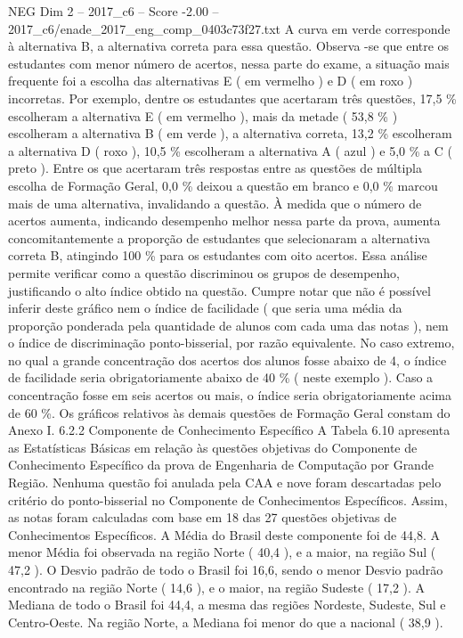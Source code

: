 \begin{textsample}{NEG Dim 2 – 2017\_c6 – Score -2.00 – 2017\_c6/enade\_2017\_eng\_comp\_0403c73f27.txt}
A curva em verde corresponde à alternativa B, a alternativa correta para essa questão.
Observa -se que entre os estudantes com menor número de acertos, nessa parte do exame, a situação mais frequente foi a escolha das alternativas E ( em vermelho ) e D ( em roxo ) incorretas.
Por exemplo, dentre os estudantes que acertaram três questões, 17,5 \% escolheram a alternativa E ( em vermelho ), mais da metade ( 53,8 \% ) escolheram a alternativa B ( em verde ), a alternativa correta, 13,2 \% escolheram a alternativa D ( roxo ), 10,5 \% escolheram a alternativa A ( azul ) e 5,0 \% a C ( preto ).
Entre os que acertaram três respostas entre as questões de múltipla escolha de Formação Geral, 0,0 \% deixou a questão em branco e 0,0 \% marcou mais de uma alternativa, invalidando a questão.
À medida que o número de acertos aumenta, indicando desempenho melhor nessa parte da prova, aumenta concomitantemente a proporção de estudantes que selecionaram a alternativa correta B, atingindo 100 \% para os estudantes com oito acertos.
Essa análise permite verificar como a questão discriminou os grupos de desempenho, justificando o alto índice obtido na questão.
Cumpre notar que não é possível inferir deste gráfico nem o índice de facilidade ( que seria uma média da proporção ponderada pela quantidade de alunos com cada uma das notas ), nem o índice de discriminação ponto-bisserial, por razão equivalente.
No caso extremo, no qual a grande concentração dos acertos dos alunos fosse abaixo de 4, o índice de facilidade seria obrigatoriamente abaixo de 40 \% ( neste exemplo ).
Caso a concentração fosse em seis acertos ou mais, o índice seria obrigatoriamente acima de 60 \%.
Os gráficos relativos às demais questões de Formação Geral constam do Anexo I. 6.2.2 Componente de Conhecimento Específico A Tabela 6.10 apresenta as Estatísticas Básicas em relação às questões objetivas do Componente de Conhecimento Específico da prova de Engenharia de Computação por Grande Região.
Nenhuma questão foi anulada pela CAA e nove foram descartadas pelo critério do ponto-bisserial no Componente de Conhecimentos Específicos.
Assim, as notas foram calculadas com base em 18 das 27 questões objetivas de Conhecimentos Específicos.
A Média do Brasil deste componente foi de 44,8.
A menor Média foi observada na região Norte ( 40,4 ), e a maior, na região Sul ( 47,2 ).
O Desvio padrão de todo o Brasil foi 16,6, sendo o menor Desvio padrão encontrado na região Norte ( 14,6 ), e o maior, na região Sudeste ( 17,2 ).
A Mediana de todo o Brasil foi 44,4, a mesma das regiões Nordeste, Sudeste, Sul e Centro-Oeste.
Na região Norte, a Mediana foi menor do que a nacional ( 38,9 ).

\end{textsample}
